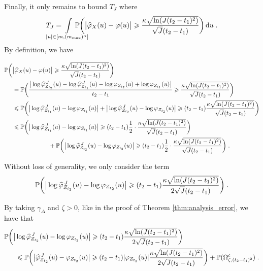 Finally, it only remains to bound $T_J$ where 
    \begin{equation*}
         T_J = \hspace{-0.8cm} \int\limits_{|u| \in [m, (\mmax)^\alpha]} \hspace{-0.8cm}
         \PP \bigg( \big| \hat \varphi_X(u) - \varphi(u)  \big| \geq \frac{\kappa \sqrt{\ln(J(t_2 - t_1)^2)}}{\sqrt{J}(t_2 - t_1)}\bigg) \du
         \eqfinp
    \end{equation*}
By definition, we have

{\small
    \begin{align*}
    \mathbb{P} \bigg( &\big| \widehat \varphi_X(u) - \varphi(u)  \big|  \geqslant \frac{\kappa \sqrt{\ln(J(t_2 - t_1)^2)}}{\sqrt{J}(t_2 - t_1)}\bigg) \\
    &= 
    \mathbb{P} \bigg( \frac{\big|  \log \widehat \varphi_{Z_{t_2}}^{\, J}  (u) 
         - \log \widehat \varphi_{Z_{t_1}}^{\, J}  (u) 
         - \log\varphi_{Z_{t_2}} (u) + \log \varphi_{Z_{t_1}} (u) \big|}{t_2 - t_1} \geqslant \frac{\kappa \sqrt{\ln(J(t_2 - t_1)^2)}}{\sqrt{J}(t_2 - t_1)}\bigg) \\
    &\leqslant
    \mathbb{P} \bigg( \big| \log \widehat \varphi_{Z_{t_1}}^{\, J}  (u) 
        - \log \varphi_{Z_{t_1}} (u) \big| +  \big|  \log \widehat \varphi_{Z_{t_2}}^{\, J}  (u)
         - \log\varphi_{Z_{t_2}} (u) \big| \geqslant (t_2 - t_1) \frac{\kappa \sqrt{\ln(J(t_2 - t_1)^2)}}{\sqrt{J}(t_2 - t_1)}\bigg) \\
    &\leqslant 
    \mathbb{P} \bigg( \big| \log \widehat \varphi_{Z_{t_1}}^{\, J}  (u) 
        - \log \varphi_{Z_{t_1}} (u) \big| \geqslant (t_2 - t_1)  \frac{1}{2} \cdot \frac{\kappa \sqrt{\ln(J(t_2 - t_1)^2)}}{\sqrt{J}(t_2 - t_1)}\bigg) \\
        &\qquad \qquad \qquad + 
    \mathbb{P} \bigg( \big| \log \widehat \varphi_{Z_{t_2}}^{\, J}  (u) 
        - \log \varphi_{Z_{t_2}} (u) \big| \geqslant  (t_2 - t_1)  \frac{1}{2} \cdot \frac{\kappa \sqrt{\ln(J(t_2 - t_1)^2)}}{\sqrt{J}(t_2 - t_1)}\bigg) 
        \; .
    \end{align*}  
}

Without loss of generality, we only consider the term
    \begin{equation*}
        \mathbb{P} \bigg( \big| \log \widehat \varphi_{Z_{t_2}}^{\, J}  (u) 
        - \log \varphi_{Z_{t_2}} (u) \big| \geqslant (t_2 - t_1)  \frac{\kappa \sqrt{\ln(J(t_2 - t_1)^2)}}{2 \sqrt{J}(t_2 - t_1)}\bigg)
        \; .
    \end{equation*}
    
By taking $\gamma_\Delta$ and $\zeta > 0$, like in the proof of Theorem \ref{thm:analysis_error}, we have that 
    \begin{align*}
        \mathbb{P} \bigg( \big| &\log \widehat \varphi_{Z_{t_2}}^{\, J}  (u) 
        - \log \varphi_{Z_{t_2}} (u) \big| \geqslant (t_2 - t_1)  \frac{\kappa \sqrt{\ln(J(t_2 - t_1)^2)}}{2 \sqrt{J}(t_2 - t_1)}\bigg) \\
        &\leqslant
        \mathbb{P} \bigg( \big| \widehat \varphi_{Z_{t_2}}^{\, J}  (u) 
        -  \varphi_{Z_{t_2}} (u) \big| \geqslant (t_2 - t_1)  | \varphi_{Z_{t_2}} (u)| \frac{\kappa \sqrt{\ln(J(t_2 - t_1)^2)}}{2 \sqrt{J}(t_2 - t_1)}\bigg) + \mathbb{P}(\Omega_{\zeta, (t_2 - t_1)^2}^c)
        \; .
    \end{align*}

